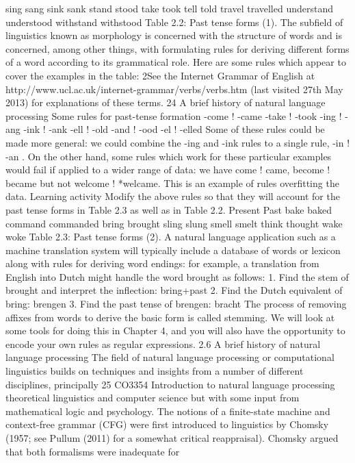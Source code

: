 sing sang
sink sank
stand stood
take took
tell told
travel travelled
understand understood
withstand withstood
Table 2.2: Past tense forms (1).
The subfield of linguistics known as morphology is concerned with the structure of
words and is concerned, among other things, with formulating rules for deriving
different forms of a word according to its grammatical role. Here are some rules
which appear to cover the examples in the table:
2See the Internet Grammar of English at http://www.ucl.ac.uk/internet-grammar/verbs/verbs.htm (last
visited 27th May 2013) for explanations of these terms.
24
A brief history of natural language processing
Some rules for past-tense formation
-come ! -came
-take ! -took
-ing ! -ang
-ink ! -ank
-ell ! -old
-and ! -ood
-el ! -elled
Some of these rules could be made more general: we could combine the -ing and
-ink rules to a single rule, -in ! -an . On the other hand, some rules which work for
these particular examples would fail if applied to a wider range of data: we have
come ! came, become ! became but not welcome ! *welcame. This is an example of
rules overfitting the data.
Learning activity
Modify the above rules so that they will account for the past tense forms in Table 2.3 as well as in Table 2.2.
Present Past
bake baked
command commanded
bring brought
sling slung
smell smelt
think thought
wake woke
Table 2.3: Past tense forms (2).
A natural language application such as a machine translation system will typically
include a database of words or lexicon along with rules for deriving word endings:
for example, a translation from English into Dutch might handle the word brought as
follows:
1. Find the stem of brought and interpret the inflection: bring+past
2. Find the Dutch equivalent of bring: brengen
3. Find the past tense of brengen: bracht
The process of removing affixes from words to derive the basic form is called
stemming. We will look at some tools for doing this in Chapter 4, and you will also
have the opportunity to encode your own rules as regular expressions.
2.6 A brief history of natural language processing
The field of natural language processing or computational linguistics builds on
techniques and insights from a number of different disciplines, principally
25
CO3354 Introduction to natural language processing
theoretical linguistics and computer science but with some input from mathematical
logic and psychology.
The notions of a finite-state machine and context-free grammar (CFG) were first
introduced to linguistics by Chomsky (1957; see Pullum (2011) for a somewhat
critical reappraisal). Chomsky argued that both formalisms were inadequate for
